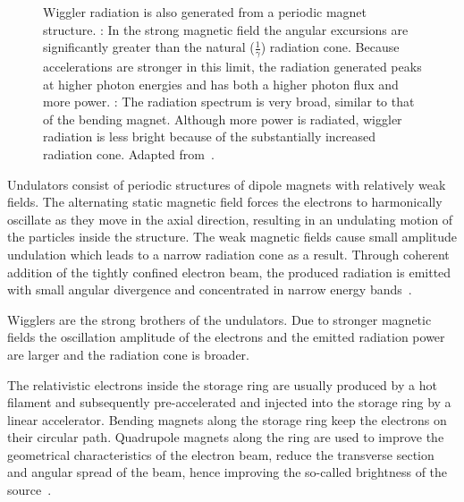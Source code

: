 \begin{figure}
	\noindent{}
	\caption[Wiggler radiation]{Wiggler radiation is also generated from a periodic magnet structure. %
		: In the strong magnetic field the angular excursions are significantly greater than the natural ($\frac{1}{\gamma}$) radiation cone. Because accelerations are stronger in this limit, the radiation generated peaks at higher photon energies and has both a higher photon flux and more power. %
		: The radiation spectrum is very broad, similar to that of the bending magnet. Although more power is radiated, wiggler radiation is less bright because of the substantially increased radiation cone. Adapted from~\cite{Attwood2007}.}%
	\label{fig:wiggler}
\end{figure}

Undulators consist of periodic structures of dipole magnets with relatively weak fields. The alternating static magnetic field forces the electrons to harmonically oscillate as they move in the axial direction, resulting in an undulating motion of the particles inside the structure. The weak magnetic fields cause small amplitude undulation which leads to a narrow radiation cone as a result. Through coherent addition of the tightly confined electron beam, the produced radiation is emitted with small angular divergence and concentrated in narrow energy bands~\cite{Stampanoni2002a}.

Wigglers are the strong brothers of the undulators. Due to stronger magnetic fields the oscillation amplitude of the electrons and the emitted radiation power are larger and the radiation cone is broader.

The relativistic electrons inside the storage ring are usually produced by a hot filament and subsequently pre-accelerated and injected into the storage ring by a linear accelerator. Bending magnets along the storage ring keep the electrons on their circular path. Quadrupole magnets along the ring are used to improve the geometrical characteristics of the electron beam, \ie reduce the transverse section and angular spread of the beam, hence improving the so-called brightness of the source~\cite{Margaritondo2002}.

